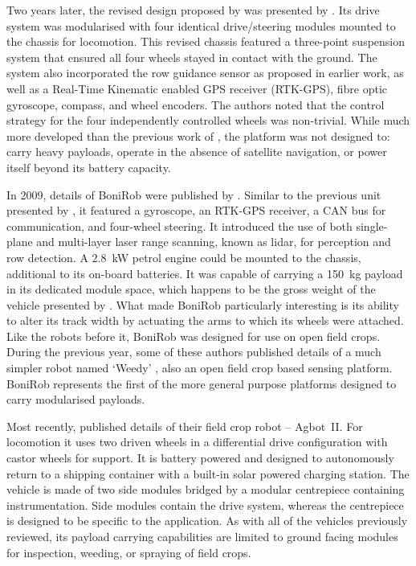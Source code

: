 \documentclass[preprint,authoryear,12pt]{elsarticle}
\begin{document}
        Two years later, the revised design proposed by \cite{Pedersen2002} was presented by \cite{Bak2004}.
        Its drive system was modularised with four identical drive/steering modules mounted to the chassis for locomotion.
        This revised chassis featured a three-point suspension system that ensured all four wheels stayed in contact with the ground.
        The system also incorporated the row guidance sensor as proposed in earlier work, as well as a Real-Time Kinematic enabled GPS receiver (RTK-GPS), fibre optic gyroscope, compass, and wheel encoders.
        The authors noted that the control strategy for the four independently controlled wheels was non-trivial.
        While much more developed than the previous work of \cite{Pedersen2002}, the platform was not designed to: carry heavy payloads, operate in the absence of satellite navigation, or power itself beyond its battery capacity.

        In 2009, details of BoniRob were published by \cite{Ruckelshausen2009}.
        Similar to the previous unit presented by \cite{Bak2004}, it featured a gyroscope, an RTK-GPS receiver, a CAN bus for communication, and four-wheel steering.
        It introduced the use of both single-plane and multi-layer laser range scanning, known as lidar, for perception and row detection.
        A \SI{2.8}{\kilo\watt} petrol engine could be mounted to the chassis, additional to its on-board batteries.
        It was capable of carrying a \SI{150}{\kilo\gram} payload in its dedicated module space, which happens to be the gross weight of the vehicle presented by \cite{Bak2004}.
        What made BoniRob particularly interesting is its ability to alter its track width by actuating the arms to which its wheels were attached.
        Like the robots before it, BoniRob was designed for use on open field crops.
        During the previous year, some of these authors published details of a much simpler robot named `Weedy' \citep{Klose2008}, also an open field crop based sensing platform.
        BoniRob represents the first of the more general purpose platforms designed to carry modularised payloads.


        Most recently, \cite{Bawden2017} published details of their field crop robot -- Agbot~II.
        For locomotion it uses two driven wheels in a differential drive configuration with castor wheels for support.
        It is battery powered and designed to autonomously return to a shipping container with a built-in solar powered charging station.
        The vehicle is made of two side modules bridged by a modular centrepiece containing instrumentation.
        Side modules contain the drive system, whereas the centrepiece is designed to be specific to the application.
        As with all of the vehicles previously reviewed, its payload carrying capabilities are limited to ground facing modules for inspection, weeding, or spraying of field crops.
\end{document}
